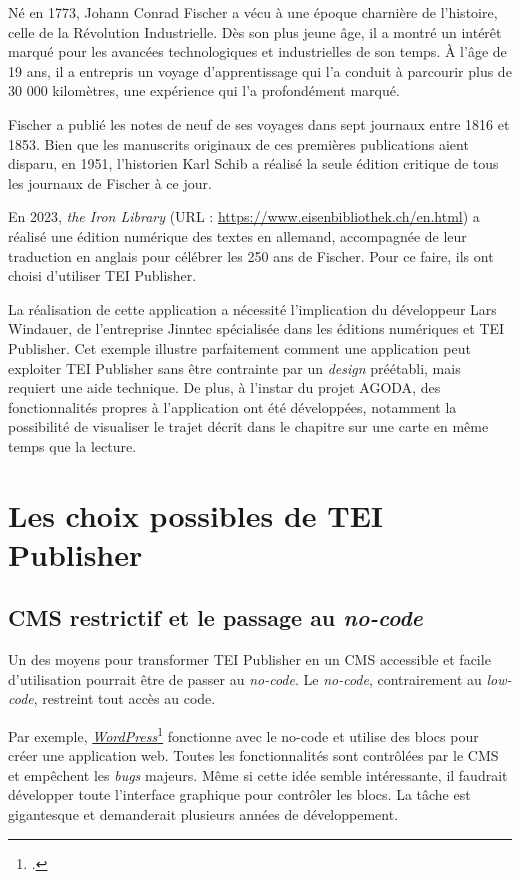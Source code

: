 Né en 1773, Johann Conrad Fischer a vécu à une époque charnière de l'histoire, celle de la Révolution Industrielle. Dès son plus jeune âge, il a montré un intérêt marqué pour les avancées technologiques et industrielles de son temps. À l'âge de 19 ans, il a entrepris un voyage d'apprentissage qui l'a conduit à parcourir plus de 30 000 kilomètres, une expérience qui l'a profondément marqué.

Fischer a publié les notes de neuf de ses voyages dans sept journaux entre 1816 et 1853. Bien que les manuscrits originaux de ces premières publications aient disparu, en 1951, l'historien Karl Schib a réalisé la seule édition critique de tous les journaux de Fischer à ce jour.

En 2023, \textit{the Iron Library} (URL : \href{https://www.eisenbibliothek.ch/en.html}{https://www.eisenbibliothek.ch/en.html}) a réalisé une édition numérique des textes en allemand, accompagnée de leur traduction en anglais pour célébrer les 250 ans de Fischer. Pour ce faire, ils ont choisi d'utiliser TEI Publisher.

La réalisation de cette application a nécessité l'implication du développeur Lars Windauer, de l'entreprise Jinntec spécialisée dans les éditions numériques et TEI Publisher. Cet exemple illustre parfaitement comment une application peut exploiter TEI Publisher sans être contrainte par un \textit{design} préétabli, mais requiert une aide technique. De plus, à l'instar du projet AGODA, des fonctionnalités propres à l'application ont été développées, notamment la possibilité de visualiser le trajet décrit dans le chapitre sur une carte en même temps que la lecture.

\chapter{Les choix possibles de TEI Publisher}

\section{CMS restrictif et le passage au \textit{no-code}}

Un des moyens pour transformer TEI Publisher en un CMS accessible et facile d'utilisation pourrait être de passer au \textit{no-code}. Le \textit{no-code}, contrairement au \textit{low-code}, restreint tout accès au code.

Par exemple, \href{https://fr.wordpress.org/}{\textit{WordPress}\footcite{WordPress}} fonctionne avec le no-code et utilise des blocs pour créer une application web. Toutes les fonctionnalités sont contrôlées par le CMS et empêchent les \textit{bugs} majeurs.
Même si cette idée semble intéressante, il faudrait développer toute l'interface graphique pour contrôler les blocs. La tâche est gigantesque et demanderait plusieurs années de développement.

